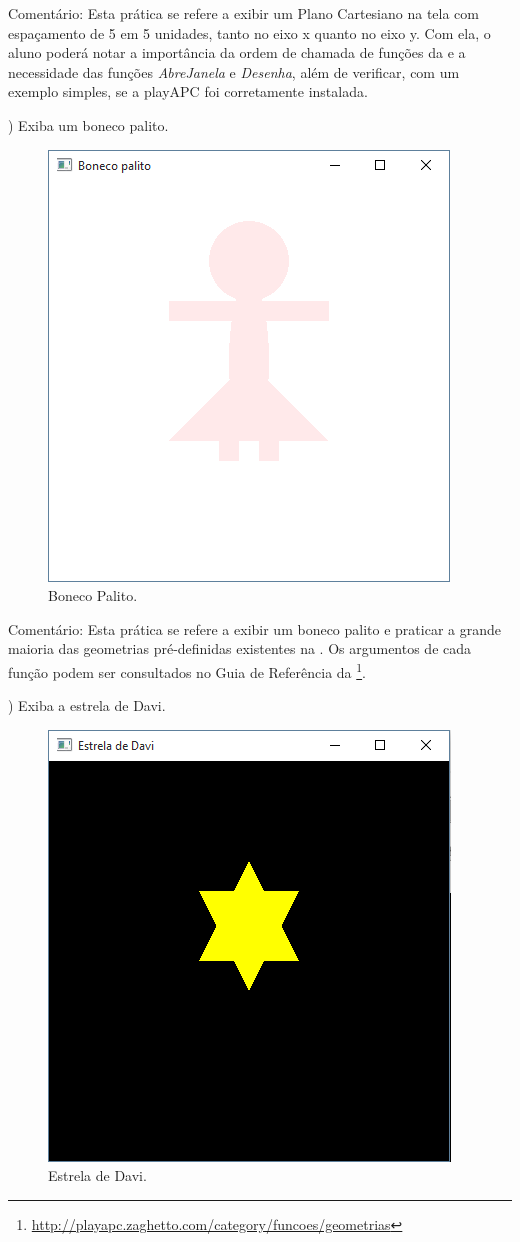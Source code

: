 \begin{renumerate}
 Comentário: Esta prática se refere a exibir um Plano Cartesiano na tela com espaçamento de 5 em 5 unidades, tanto no eixo x quanto no eixo y. Com ela, o aluno poderá notar a importância da ordem de chamada de funções da \playAPC{} e a necessidade das funções \emph{AbreJanela} e \emph{Desenha}, além de verificar, com um exemplo simples, se a playAPC{} foi corretamente instalada.

%


\item) \label{ex:cap01_ex2} Exiba um boneco palito.
  
  \begin{figure}[H]
    \centerline{\includegraphics[width=.25\textwidth]{img/cap1_ex3.png}}
    \caption{Boneco Palito.}
    \label{fig:cap01_ex2}
  \end{figure}

 Comentário: Esta prática se refere a exibir um boneco palito e praticar a grande maioria das geometrias pré-definidas existentes na \playAPC{}. Os argumentos de cada função podem ser consultados no Guia de Referência da \playAPC \footnote{\url{http://playapc.zaghetto.com/category/funcoes/geometrias}}.
%

\item)
 Exiba a estrela de Davi.
  \label{ex:cap01_ex3}

  \begin{figure}[H]
    \centerline{\includegraphics[width=.25\textwidth]{img/cap1_ex2.png}}
    \caption{Estrela de Davi.}
    \label{fig:cap01_ex3}
  \end{figure}


\end{renumerate}
